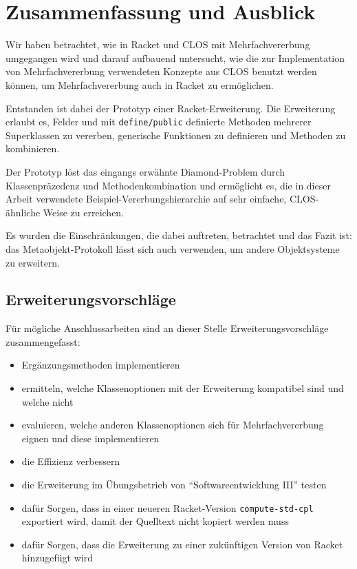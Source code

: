 \chapter{Zusammenfassung und Ausblick}
Wir haben betrachtet, wie in Racket und CLOS mit Mehrfachvererbung umgegangen wird und darauf aufbauend untersucht, wie die zur Implementation von Mehrfachvererbung verwendeten Konzepte aus CLOS benutzt werden können, um Mehrfachvererbung auch in Racket zu ermöglichen.

Entstanden ist dabei der Prototyp einer Racket-Erweiterung. Die Erweiterung erlaubt es, Felder und mit \texttt{define/public} definierte Methoden mehrerer Superklassen zu vererben, generische Funktionen zu definieren und Methoden zu kombinieren.

Der Prototyp löst das eingangs erwähnte Diamond-Problem durch Klassenpräzedenz und Methodenkombination und ermöglicht es, die in dieser Arbeit verwendete Beispiel-Vererbungshierarchie auf sehr einfache, CLOS-ähnliche Weise zu erreichen.

Es wurden die Einschränkungen, die dabei auftreten, betrachtet und das Fazit ist: das Metaobjekt-Protokoll lässt sich auch verwenden, um andere Objektsysteme zu erweitern.

\section{Erweiterungsvorschläge}

Für mögliche Anschlussarbeiten sind an dieser Stelle Erweiterungsvorschläge zusammengefasst:
\begin{itemize}
 \item Ergänzungsmethoden implementieren
 \item ermitteln, welche Klassenoptionen mit der Erweiterung kompatibel sind und welche nicht
 \item evaluieren, welche anderen Klassenoptionen sich für Mehrfachvererbung eignen und diese implementieren
 \item die Effizienz verbessern
 \item die Erweiterung im Übungsbetrieb von ``Softwareentwicklung III'' testen
 \item dafür Sorgen, dass in einer neueren Racket-Version \texttt{compute-std-cpl} exportiert wird, damit der Quelltext nicht kopiert werden muss
 \item dafür Sorgen, dass die Erweiterung zu einer zukünftigen Version von Racket hinzugefügt wird 
\end{itemize}